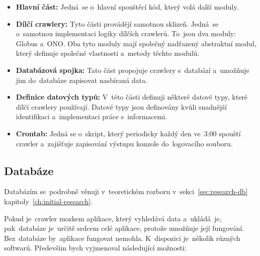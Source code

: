 \begin{itemize}
    \item \textbf{Hlavní část:} Jedná~se o~hlavní spouštěcí kód, který volá
        další moduly.
    \item \textbf{Dílčí crawlery:} Tyto části provádějí samotnou sklizeň.
        Jedná~se o~samotnou implementaci logiky dílčích crawlerů. To~jsou
        dva moduly: Globus a~ONO. Oba tyto moduly mají společný nadřazený
        abstraktní modul, který definuje společné vlastnosti a~metody
        těchto modulů.
    \item \textbf{Databázová spojka:} Tato část propojuje crawlery s~databází
        a~umožňuje jim do~databáze zapisovat nasbíraná data.
    \item \textbf{Definice datových typů:} V~této části definuji některé
        datové typy, které dílčí crawlery používají. Datové typy jsou
        definovány kvůli snadnější identifikaci a~implementaci práce
        s~informacemi.
    \item \textbf{Crontab:} Jedná se o~skript, který periodicky každý den
        ve~3:00 spouští crawler a~zajišťuje zapisování výstupu konzole
        do~logovacího souboru.
\end{itemize}

\subsection{Databáze}
\label{sec:preps-db}

Databázím se~podrobně věnuji v~teoretickém rozboru
v~sekci~\ref{sec:research-db} kapitoly~\ref{ch:initial-research}.

Pokud je~crawler mozkem aplikace, který vyhledává data a~ukládá~je,
pak~databáze je~určitě srdcem celé aplikace, protože umožňuje její fungování.
Bez~databáze by~aplikace fungovat nemohla. K~dispozici je~několik různých
softwarů. Především bych vyjmenoval následující možnosti:


